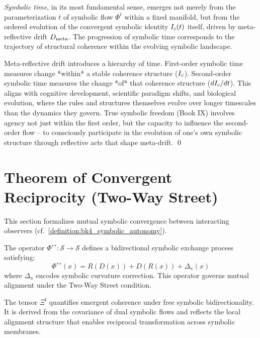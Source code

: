 \begin{definition}
\label{definition:bk7_symbolic_time_as_structural_evolution}
\emph{Symbolic time}, in its most fundamental sense, emerges not merely from the parameterization \(t\) of symbolic flow \(\Phi^t\) within a fixed manifold, but from the ordered evolution of the convergent symbolic identity \(I_c(t)\) itself, driven by meta-reflective drift \(D_{\mathrm{meta}}\). The progression of symbolic time corresponds to the trajectory of structural coherence within the evolving symbolic landscape.
\end{definition}
\begin{scholium}

\label{scholium:bk7_unnamed_scholium_02}Meta-reflective drift introduces a hierarchy of time. First-order symbolic time measures change *within* a stable coherence structure (\(I_c\)). Second-order symbolic time measures the change *of* that coherence structure (\(dI_c/dt\)). This aligns with cognitive development, scientific paradigm shifts, and biological evolution, where the rules and structures themselves evolve over longer timescales than the dynamics they govern. True symbolic freedom (Book IX) involves agency not just within the first order, but the capacity to influence the second-order flow -- to consciously participate in the evolution of one's own symbolic structure through reflective acts that shape meta-drift. \qed \end{scholium}
\section{Theorem of Convergent Reciprocity (Two-Way Street)}
\label{sec:bk7_theorem_of_convergent_reciprocity_two_way_street}
This section formalizes mutual symbolic convergence between interacting observers (cf.~\ref{definition:bk4_symbolic_autonomy}).
\begin{definition}
\label{definition:bk7_two_way_flow_operator_}
The operator \(\Phi^{\leftrightarrow} : \mathcal{S} \to \mathcal{S}\) defines a bidirectional symbolic exchange process satisfying:
\[
\Phi^{\leftrightarrow}(x) = R(D(x)) + D(R(x)) + \Delta_\kappa(x)
\]
where \(\Delta_\kappa\) encodes symbolic curvature correction. This operator governs mutual alignment under the Two-Way Street condition.
\end{definition}
\begin{definition}
\label{definition:bk7_symbolic_convergence_tensor_f}
The tensor \(\Xi^{\mathrm{f}}\) quantifies emergent coherence under free symbolic bidirectionality. It is derived from the covariance of dual symbolic flows and reflects the local alignment structure that enables reciprocal transformation across symbolic membranes.
\end{definition}
